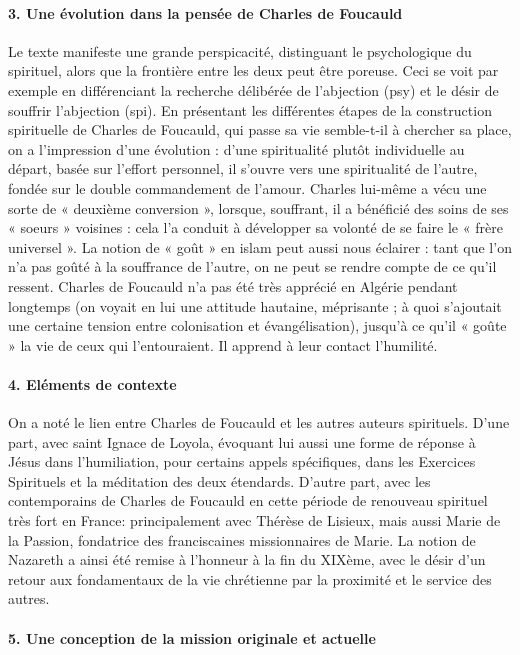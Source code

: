 \paragraph{3. Une évolution dans la pensée de Charles de Foucauld}
Le texte manifeste une grande perspicacité, distinguant le psychologique du spirituel, alors que la frontière entre les deux peut être poreuse. Ceci se voit par exemple en différenciant la recherche délibérée de l’abjection (psy) et le désir de souffrir l’abjection (spi). En présentant les différentes étapes de la construction spirituelle de Charles de Foucauld, qui passe sa vie semble-t-il à chercher sa place, on a l’impression d’une évolution : d’une spiritualité plutôt individuelle au départ, basée sur l’effort personnel, il s’ouvre vers une spiritualité de l’autre, fondée sur le double commandement de l’amour. Charles lui-même a vécu une sorte de « deuxième conversion », lorsque, souffrant, il a bénéficié des soins de ses « soeurs » voisines : cela l’a conduit à développer sa volonté de se faire le « frère universel ».
La notion de « goût » en islam peut aussi nous éclairer : tant que l’on n’a pas goûté à la souffrance de l’autre, on ne peut se rendre compte de ce qu’il ressent. Charles de Foucauld n’a pas été très apprécié en Algérie pendant longtemps (on voyait en lui une attitude hautaine, méprisante ; à quoi s’ajoutait une certaine tension entre colonisation et évangélisation), jusqu’à ce qu’il « goûte » la vie de ceux qui l’entouraient. Il apprend à leur contact l’humilité.

\paragraph{4. Eléments de contexte}
On a noté le lien entre Charles de Foucauld et les autres auteurs spirituels. D’une part, avec saint Ignace de Loyola, évoquant lui aussi une forme de réponse à Jésus dans l’humiliation, pour certains appels spécifiques, dans les Exercices Spirituels et la méditation des deux étendards. D’autre part, avec les contemporains de Charles de Foucauld en cette période de renouveau spirituel très fort en France: principalement avec Thérèse de Lisieux, mais aussi Marie de la Passion, fondatrice des franciscaines missionnaires de Marie. La notion de Nazareth a ainsi été remise à l’honneur à la fin du XIXème, avec le désir d’un retour aux fondamentaux de la vie chrétienne par la proximité et le service des autres.
\paragraph{5. Une conception de la mission originale et actuelle}


